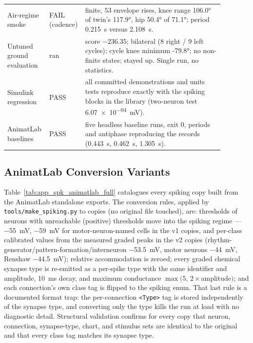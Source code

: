 \begin{table}
\begin{tabular}{@{}p{0.16\linewidth}p{0.10\linewidth}p{0.62\linewidth}@{}}
Air-regime smoke & FAIL (cadence) & finite, 53 envelope rises, knee range \ang{106.0} of twin's \ang{117.9}, hip \ang{50.4} of \ang{71.1}; period \qty{0.215}{\second} versus \qty{2.108}{\second}. \\
Untuned ground evaluation & ran & score $-236.35$; bilateral (8 right / 9 left cycles); cycle knee minimum \ang{-79.8}; no non-finite states; stayed up. Single run, no statistics. \\
Simulink regression & PASS & all committed demonstrations and units tests reproduce exactly with the spiking blocks in the library (two-neuron test \qty{6.07e-04}{\mV}). \\
AnimatLab baselines & PASS & five headless baseline runs, exit 0, periods and antiphase reproducing the records (\qty{0.443}{\second}, \qty{0.462}{\second}, \qty{1.305}{\second}). \\
\bottomrule
\end{tabular}
\end{table}

\subsection{AnimatLab Conversion Variants}

Table~\ref{tab:app_spk_animatlab_full} catalogues every spiking copy built from the AnimatLab standalone exports. The conversion rules, applied by \texttt{tools/make\_spiking.py} to copies (no original file touched), are: thresholds of neurons with unreachable (positive) thresholds move into the spiking regime --- \qty{-55}{\mV}, \qty{-59}{\mV} for motor-neuron-named cells in the v1 copies, and per-class calibrated values from the measured graded peaks in the v2 copies (rhythm-generator/pattern-formation/interneuron \qty{-53.5}{\mV}, motor neurons \qty{-44}{\mV}, Renshaw \qty{-44.5}{\mV}); relative accommodation is zeroed; every graded chemical synapse type is re-emitted as a per-spike type with the same identifier and amplitude, \qty{10}{\ms} decay, and maximum conductance $\max(5,\,2\times$amplitude$)$; and each connection's own class tag is flipped to the spiking enum. That last rule is a documented format trap: the per-connection \texttt{<Type>} tag is stored independently of the synapse type, and converting only the type kills the run at load with no diagnostic detail. Structural validation confirms for every copy that neuron, connection, synapse-type, chart, and stimulus sets are identical to the original and that every class tag matches its synapse type.

